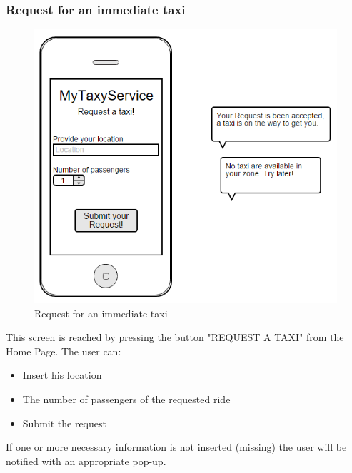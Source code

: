 \subsubsection{Request for an immediate taxi}
\begin{figure}[H]
\centering
\includegraphics[scale=0.6]{Images/taxi_request}
\caption{Request for an immediate taxi}
\end{figure}
This screen is reached by pressing the button "REQUEST A TAXI" from the Home Page. The user can:
\begin{itemize}
\item Insert his location
\item The number of passengers of the requested ride
\item Submit the request
\end{itemize} 
If one or more necessary information is not inserted (missing) the user will be notified with an appropriate pop-up.


